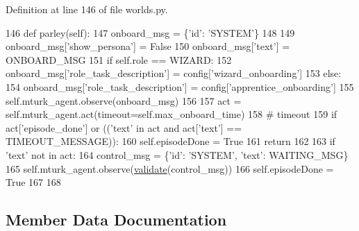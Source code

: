 Definition at line 146 of file worlds.\+py.


\begin{DoxyCode}
146     \textcolor{keyword}{def }parley(self):
147         onboard\_msg = \{\textcolor{stringliteral}{'id'}: \textcolor{stringliteral}{'SYSTEM'}\}
148 
149         onboard\_msg[\textcolor{stringliteral}{'show\_persona'}] = \textcolor{keyword}{False}
150         onboard\_msg[\textcolor{stringliteral}{'text'}] = ONBOARD\_MSG
151         \textcolor{keywordflow}{if} self.role == WIZARD:
152             onboard\_msg[\textcolor{stringliteral}{'role\_task\_description'}] = config[\textcolor{stringliteral}{'wizard\_onboarding'}]
153         \textcolor{keywordflow}{else}:
154             onboard\_msg[\textcolor{stringliteral}{'role\_task\_description'}] = config[\textcolor{stringliteral}{'apprentice\_onboarding'}]
155         self.mturk\_agent.observe(onboard\_msg)
156 
157         act = self.mturk\_agent.act(timeout=self.max\_onboard\_time)
158         \textcolor{comment}{# timeout}
159         \textcolor{keywordflow}{if} act[\textcolor{stringliteral}{'episode\_done'}] \textcolor{keywordflow}{or} ((\textcolor{stringliteral}{'text'} \textcolor{keywordflow}{in} act \textcolor{keywordflow}{and} act[\textcolor{stringliteral}{'text'}] == TIMEOUT\_MESSAGE)):
160             self.episodeDone = \textcolor{keyword}{True}
161             \textcolor{keywordflow}{return}
162 
163         \textcolor{keywordflow}{if} \textcolor{stringliteral}{'text'} \textcolor{keywordflow}{not} \textcolor{keywordflow}{in} act:
164             control\_msg = \{\textcolor{stringliteral}{'id'}: \textcolor{stringliteral}{'SYSTEM'}, \textcolor{stringliteral}{'text'}: WAITING\_MSG\}
165             self.mturk\_agent.observe(\hyperlink{namespaceparlai_1_1core_1_1worlds_afc3fad603b7bce41dbdc9cdc04a9c794}{validate}(control\_msg))
166             self.episodeDone = \textcolor{keyword}{True}
167 
168 
\end{DoxyCode}


\subsection{Member Data Documentation}
\mbox{\label{classparlai_1_1mturk_1_1tasks_1_1wizard__of__wikipedia_1_1worlds_1_1RoleOnboardWorld_a37cf10b9e972e9de5dae2191cbe46c2b}} 
